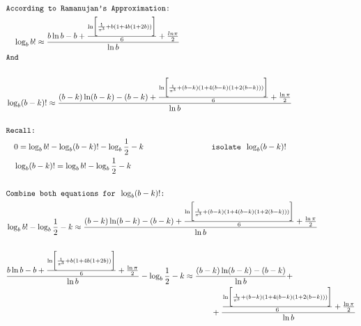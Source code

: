 \documentclass[fleqn, a4paper,12pt]{article}
\begin{document}
\small
\[
\begin{aligned}
& \\
& \texttt{According to Ramanujan's Approximation: } \\
& \quad \log_bb! \approx \frac{b\ln b - b + \frac{\ln\biggl[\frac{1}{\pi^3} + b(1+4b(1+2b)) \biggr]}{6} + \frac{ln\pi}{2}}{\ln b} \\
& \texttt{And} \\
& \\
& \log_b(b-k)! \approx \frac{(b-k)\ln(b-k) - (b-k) + \frac{\ln \biggl[\frac{1}{\pi^3} +  (b-k)(1+4(b-k)(1+2(b-k)))\biggr]}{6} + \frac{\ln\pi}{2}}{\ln b} \\
& \\
& \texttt{Recall: } \\
& \quad 0 = \log_bb! - \log_b(b-k)! - \log_b\frac{1}{2} - k \hspace{2.8cm} \texttt{ isolate } \log_b(b-k)! \\
& \quad \log_b(b-k)! = \log_bb! - \log_b\frac{1}{2} - k \\
& \\
& \texttt{Combine both equations for } \log_b(b-k)! \texttt{: } \\
& \log_bb! - \log_b\frac{1}{2} - k \approx \frac{(b-k)\ln(b-k) - (b-k) + \frac{\ln \biggl[\frac{1}{\pi^3} + (b-k)(1+4(b-k)(1+2(b-k)))\biggr]}{6} + \frac{\ln\pi}{2}}{\ln b} \\
& \\
& \frac{b\ln b - b + \frac{\ln\biggl[\frac{1}{\pi^3} +  b(1+4b(1+2b)) \biggr]}{6} + \frac{\ln\pi}{2}}{\ln b} - \log_b\frac{1}{2} - k \approx \frac{(b-k)\ln(b-k) - (b-k)}{\ln b} +  \\ 
& \hspace{9cm} + \frac{\frac{\ln \biggl[\frac{1}{\pi^3} +  (b-k)(1+4(b-k)(1+2(b-k))) \biggr]}{6} + \frac{\ln\pi}{2}}{\ln b} \\
\end{aligned}
\]
\end{document}
